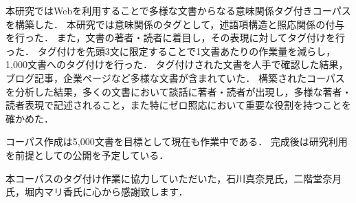 \documentclass[japanese]{jnlp_1.4}
\begin{document}
本研究ではWebを利用することで多様な文書からなる意味関係タグ付きコーパスを構築した．
本研究では意味関係のタグとして，述語項構造と照応関係の付与を行った．
また，文書の著者・読者に着目し，その表現に対してタグ付けを行った．
タグ付けを先頭3文に限定することで1文書あたりの作業量を減らし，1,000文書へのタグ付けを行った．
タグ付けされた文書を人手で確認した結果，ブログ記事，企業ページなど多様な文書が含まれていた．
構築されたコーパスを分析した結果，多くの文書において談話に著者・読者が出現し，多様な著者・読者表現で記述されること，また特にゼロ照応において重要な役割を持つことを確かめた．

コーパス作成は5,000文書を目標として現在も作業中である．
完成後は研究利用を前提としての公開を予定している．



\acknowledgment
本コーパスのタグ付け作業に協力していただいた，石川真奈見氏，二階堂奈月氏，堀内マリ香氏に心から感謝致します．
\end{document}
